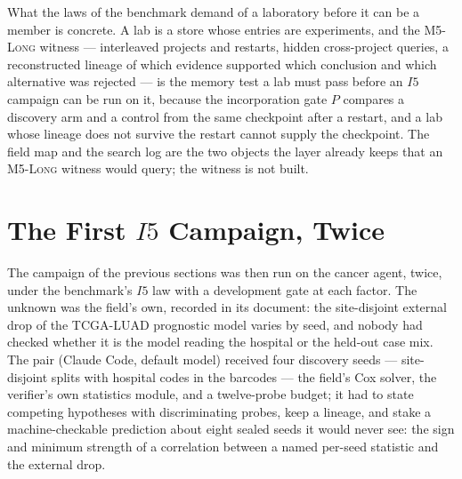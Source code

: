 \documentclass[11pt]{article}
\theoremstyle{definition}
\begin{document}
What the laws of the benchmark demand of a laboratory before it can be a member is concrete. A lab is a store whose entries are experiments, and the \textsc{M5-Long} witness --- interleaved projects and restarts, hidden cross-project queries, a reconstructed lineage of which evidence supported which conclusion and which alternative was rejected --- is the memory test a lab must pass before an $I5$ campaign can be run on it, because the incorporation gate $P$ compares a discovery arm and a control from the same checkpoint after a restart, and a lab whose lineage does not survive the restart cannot supply the checkpoint. The field map and the search log are the two objects the layer already keeps that an \textsc{M5-Long} witness would query; the witness is not built.

\section{The First $I5$ Campaign, Twice}\label{sec:i5run}

The campaign of the previous sections was then run on the cancer agent, twice, under the benchmark's $I5$ law with a development gate at each factor. The unknown was the field's own, recorded in its document: the site-disjoint external drop of the TCGA-LUAD prognostic model varies by seed, and nobody had checked whether it is the model reading the hospital or the held-out case mix. The pair (Claude Code, default model) received four discovery seeds --- site-disjoint splits with hospital codes in the barcodes --- the field's Cox solver, the verifier's own statistics module, and a twelve-probe budget; it had to state competing hypotheses with discriminating probes, keep a lineage, and stake a machine-checkable prediction about eight sealed seeds it would never see: the sign and minimum strength of a correlation between a named per-seed statistic and the external drop.
\end{document}
